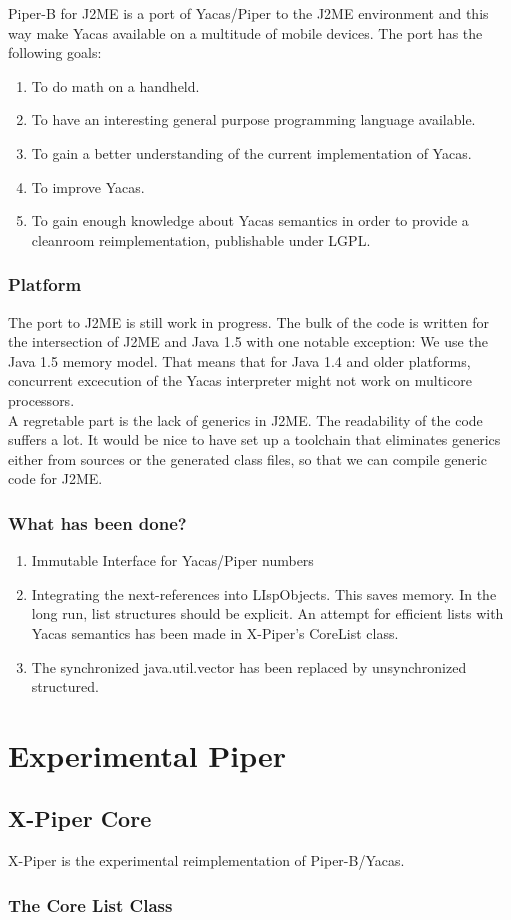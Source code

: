 Piper-B for J2ME is a port of Yacas/Piper to the J2ME environment and this way
make Yacas available on a multitude of mobile devices. The port has the
following goals:
\begin{enumerate}
\item To do math on a handheld.
\item To have an interesting general purpose programming language available.
\item To gain a better understanding of the current implementation of Yacas.
\item To improve Yacas.
\item To gain enough knowledge about Yacas semantics in order to provide
a cleanroom reimplementation, publishable under LGPL.
\end{enumerate}

\subsection{Platform}

The port to J2ME is still work in progress. The bulk of the code is written
for the intersection of J2ME and Java 1.5 with one notable exception: We
use the Java 1.5 memory model. That means that for Java 1.4 and older
platforms, concurrent excecution of the Yacas interpreter might not work
on multicore processors.\\
A regretable part is the lack of generics in J2ME. The readability of
the code suffers a lot. It would be nice to have set up a toolchain that
eliminates generics either from sources or the generated class files,
so that we can compile generic code for J2ME.

\subsection{What has been done?}

\begin{enumerate}
\item Immutable Interface for Yacas/Piper numbers
\item Integrating the next-references into LIspObjects. This saves memory.
In the long run, list structures should be explicit. An attempt for
efficient lists with Yacas semantics has been made in X-Piper's CoreList class.
\item The synchronized java.util.vector has been replaced by unsynchronized
structured.
\end{enumerate}


\chapter{Experimental Piper}

\section{X-Piper Core}

X-Piper is the experimental reimplementation of Piper-B/Yacas.

\subsection{The Core List Class}




